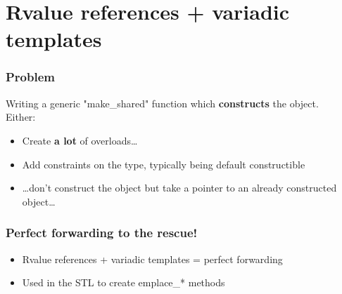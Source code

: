 \documentclass[xcolor=dvipsnames]{beamer}
\begin{document}
\section{Rvalue references + variadic templates}
\begin{frame}[fragile]
  \frametitle{Problem}
  Writing a generic "make\_shared" function which \textbf{constructs} the object.\\
  Either:
  \begin{itemize}
    \item Create \textbf{a lot} of overloads\ldots
      \pause
    \item Add constraints on the type, typically being default constructible
      \pause
    \item \ldots don't construct the object but take a pointer to an already constructed object\ldots
  \end{itemize}

  

\end{frame}
\begin{frame}[fragile]
  \frametitle{Perfect forwarding to the rescue!}
  \begin{itemize}
    \item Rvalue references + variadic templates = perfect forwarding
  \end{itemize}

  
  \pause
  \begin{itemize}
    \item Used in the STL to create emplace\_* methods
  \end{itemize}

  
\end{frame}
\end{document}
